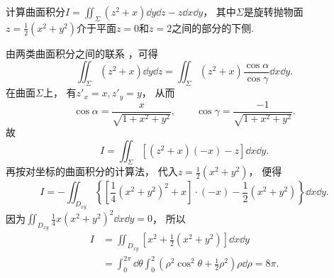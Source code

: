 \begin{example}
计算曲面积分\(I=\iint_\Sigma (z^2+x) \dd{y}\dd{z} - z \dd{x}\dd{y}\)，
其中\(\Sigma\)是旋转抛物面\(z = \frac{1}{2}(x^2+y^2)\)介于平面\(z=0\)和\(z=2\)之间的部分的下侧.
\begin{solution}
由两类曲面积分之间的联系 ，可得\begin{equation*}
	\iint_\Sigma (z^2+x) \dd{y}\dd{z}
	= \iint_\Sigma (z^2+x) \frac{\cos\alpha}{\cos\gamma} \dd{x}\dd{y}.
\end{equation*}
在曲面\(\Sigma\)上，
有\(z'_x = x, z'_y = y\)，
从而\begin{equation*}
	\cos\alpha
	= \frac{x}{\sqrt{1+x^2+y^2}},
	\qquad
	\cos\gamma
	= \frac{-1}{\sqrt{1+x^2+y^2}}.
\end{equation*}
故\begin{equation*}
	I = \iint_\Sigma [(z^2+x)(-x) - z] \dd{x}\dd{y}.
\end{equation*}
再按对坐标的曲面积分的计算法，
代入\(z = \frac{1}{2}(x^2+y^2)\)，
便得\begin{equation*}
	I = - \iint_{D_{xy}} \left\{
		\left[
			\frac{1}{4} (x^2+y^2)^2
			+ x
		\right] \cdot (-x)
		- \frac{1}{2} (x^2+y^2)
	\right\} \dd{x}\dd{y}.
\end{equation*}
因为\(\iint_{D_{xy}} \frac{1}{4} x(x^2+y^2)^2 \dd{x}\dd{y} = 0\)，
所以\begin{align*}
	I
	&= \iint_{D_{xy}} \left[x^2+\frac{1}{2}(x^2+y^2)\right] \dd{x}\dd{y} \\
	&= \int_0^{2\pi} \dd{\theta}
		\int_0^2 \left(\rho^2 \cos^2\theta + \frac{1}{2} \rho^2\right) \rho \dd{\rho}
	= 8\pi.
\end{align*}
\end{solution}
\end{example}
